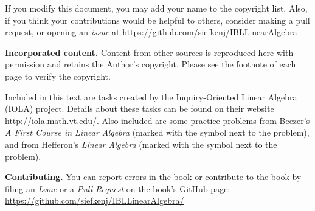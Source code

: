 If you modify this document, you may add your name to the copyright list. Also,
if you think your contributions would be helpful to others, consider making a
pull request, or opening an \emph{issue} at \url{https://github.com/siefkenj/IBLLinearAlgebra}

{\bf Incorporated content.}
Content from other sources is reproduced here with permission and retains the
Author's copyright. Please see the footnote of each page to verify the
copyright.

Included in this text are tasks created by the Inquiry-Oriented Linear Algebra (IOLA) project. Details
about these tasks can be found on their website \url{http://iola.math.vt.edu/}. Also included are some
practice problems from Beezer's \emph{A First Course in Linear Algebra} (marked with the symbol \beezer next to the
problem), and from Hefferon's \emph{Linear Algebra} (marked with the symbol \hefferon next to the problem).

{\bf Contributing.} You can report errors in the book or contribute to the book by filing an \emph{Issue} or
a \emph{Pull Request} on the book's GitHub page: \url{https://github.com/siefkenj/IBLLinearAlgebra/}

